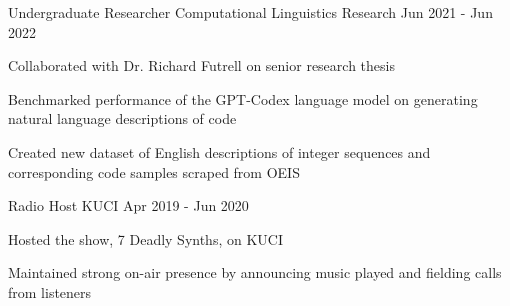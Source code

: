 
\begin{cventries}
	\cventry
	{Undergraduate Researcher}
	{Computational Linguistics Research}
	{}
	{Jun 2021 - Jun 2022}
	{\begin{cvitems}
		\item{Collaborated with Dr. Richard Futrell on senior research thesis}
		\item{Benchmarked performance of the GPT-Codex language model on generating natural language descriptions of code}
        \item{Created new dataset of English descriptions of integer sequences and corresponding code samples scraped from OEIS}
	 \end{cvitems}
	}
 
	 \cventry
	 {Radio Host}
	 {KUCI}
	 {}
	 {Apr 2019 - Jun 2020}
	 {
	 	\begin{cvitems}
	 		\item {Hosted the show, 7 Deadly Synths, on KUCI}
	 		\item {Maintained strong on-air presence by announcing music played and fielding calls from listeners}
	 	\end{cvitems}
	 }
	
\end{cventries}
